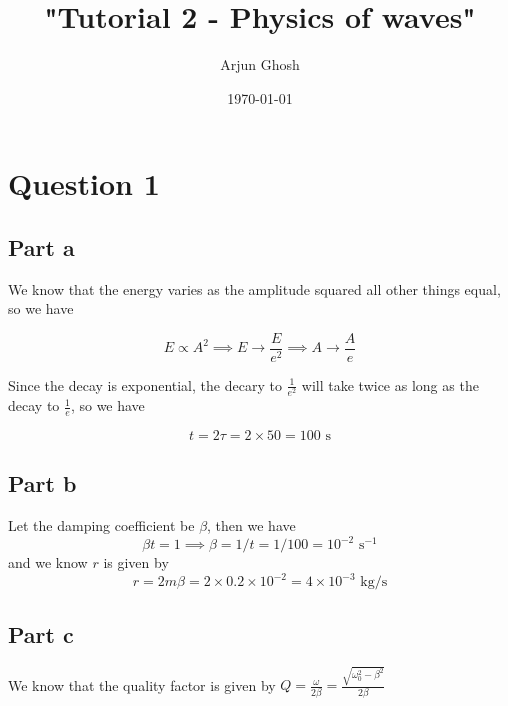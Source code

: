 \documentclass{article}
\title{"Tutorial 2 - Physics of waves"}
\author{Arjun Ghosh}
\date{\today}
\begin{document}
\section{Question 1}
\subsection{Part a}
We know that the energy varies as the amplitude squared all other things equal, so we have

$$
E \propto A^{2} \implies E \to \frac{E}{e^2} \implies A \to \frac{A}{e}
$$

Since the decay is exponential, the decary to $\frac{1}{e^2}$ will take twice as long as the decay to $\frac{1}{e}$, so we have

$$
t = 2 \tau = 2 \times 50 = 100 \text{ s}
$$
\subsection{Part b}
Let the damping coefficient be $\beta$, then we have
$$
\beta t = 1 \implies \beta = 1/t = 1/100 = 10^{-2} \text{ s}^{-1}
$$
and we know $r$ is given by 
$$
r = 2m\beta = 2 \times 0.2 \times 10^{-2} = 4 \times 10^{-3} \text{ kg/s}
$$

\subsection{Part c}
We know that the quality factor is given by $Q=\frac{\omega}{2\beta}=\frac{ \sqrt{ \omega_0^2 - \beta^2 } }{2\beta}$
\end{document}
